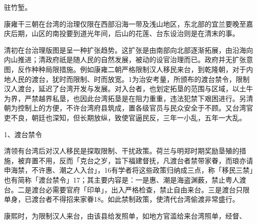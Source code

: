 \vfill
\begin{BookNotes}
\end{BookNotes}

\noindent 驻竹堑。

康雍干三朝在台湾的治理仅限在西部沿海一带及浅山地区，东北部的宜兰要晚至嘉庆后期，山区的南投要到道光年间，后山的花莲、台东设治则是在清末的事。


清初在台治理版图是呈一种扩张趋势。这扩张是由南部向北部逐渐拓展，由沿海向内山推进；清政府祇是随人民的自然发展，被动的设官治理而已。政府并无扩张意图，反作种种局限措施。例如康雍二朝严格限制汉人移民来台，到乾隆朝，对于内地人民的渡台，犹时而限制、时而放宽。1为治安考量，所颁布的渡台禁令，限制汉人渡台，延迟了台湾开发与发展。对入台者，也划定拓垦的范围与区域，以土牛为界，严禁越界私垦，也因此台湾拓垦是在阻力重重，违法犯禁下艰困进行。另清朝为控制上的方便，不许台湾府县筑成，置各级官员与民众安全于不顾。又台湾官吏不良，朝廷也深知，但长期放纵，致使官逼民反，三年一小乱，五年一大乱。

1、渡台禁令

清领有台湾后对汉人移民是探取限制、干扰政策。荷兰与明郑时期奖励垦殖的措施，被弃置不用，反而「克台之岁，旨下福建督抚，凡渡台者禁带家眷，而琅亦请申海禁，不许惠、潮之人入台」，16有学者将这些政策归纳成三点，称「移民三禁」也有简称「渡台禁令」17；其主要内容是：一是惠、潮是海盗渊薮，禁止粤人渡台。二是渡台必需要官府「印单」，出入严格检查，禁止自由来台。三是渡台只限单身，已渡台者不得招来家眷18。如此禁制政策，使清代台湾偷渡非常盛行。

康熙时，为限制汉人来台，由该县给发照单，如地方官滥给来台湾照单，经督、

\vfill
\begin{BookNotes}
\end{BookNotes}

